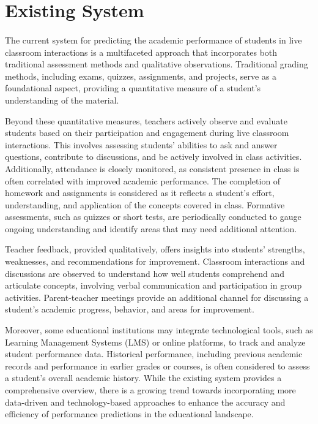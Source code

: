\section{Existing System}
\paragraph{}
The current system for predicting the academic performance of students in live classroom interactions is a multifaceted approach that incorporates both traditional assessment methods and qualitative observations. Traditional grading methods, including exams, quizzes, assignments, and projects, serve as a foundational aspect, providing a quantitative measure of a student's understanding of the material. 
\par Beyond these quantitative measures, teachers actively observe and evaluate students based on their participation and engagement during live classroom interactions. This involves assessing students' abilities to ask and answer questions, contribute to discussions, and be actively involved in class activities. Additionally, attendance is closely monitored, as consistent presence in class is often correlated with improved academic performance. The completion of homework and assignments is considered as it reflects a student's effort, understanding, and application of the concepts covered in class. Formative assessments, such as quizzes or short tests, are periodically conducted to gauge ongoing understanding and identify areas that may need additional attention. 
\par Teacher feedback, provided qualitatively, offers insights into students' strengths, weaknesses, and recommendations for improvement. Classroom interactions and discussions are observed to understand how well students comprehend and articulate concepts, involving verbal communication and participation in group activities. Parent-teacher meetings provide an additional channel for discussing a student's academic progress, behavior, and areas for improvement. 
\par Moreover, some educational institutions may integrate technological tools, such as Learning Management Systems (LMS) or online platforms, to track and analyze student performance data. Historical performance, including previous academic records and performance in earlier grades or courses, is often considered to assess a student's overall academic history. While the existing system provides a comprehensive overview, there is a growing trend towards incorporating more data-driven and technology-based approaches to enhance the accuracy and efficiency of performance predictions in the educational landscape.
